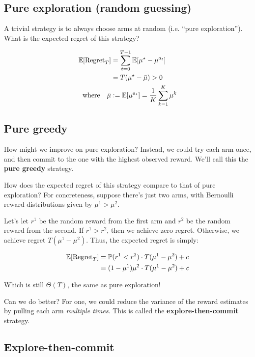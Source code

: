 \documentclass[../main/main]{subfiles}
\begin{document}

\subsection{Pure exploration (random guessing)}

A trivial strategy is to always choose arms at random (i.e. ``pure exploration''). What is the expected regret of this strategy?

\begin{align*}
    \operatorname*{\mathbb{E}}[\text{Regret}_T] &= \sum_{t=0}^{T-1} \operatorname*{\mathbb{E}}[\mu^\star - \mu^{a_t}] \\
    &= T (\mu^\star - \bar \mu) > 0 \\
    \text{where} \quad \bar \mu &:= \operatorname*{\mathbb{E}}[\mu^{a_t}] = \frac{1}{K} \sum_{k=1}^K \mu^k
\end{align*}


\subsection{Pure greedy}

How might we improve on pure exploration? Instead, we could try each arm once, and then commit to the one with the highest observed reward. We'll call this the \textbf{pure greedy} strategy.

How does the expected regret of this strategy compare to that of pure exploration? For concreteness, suppose there's just two arms, with Bernoulli reward distributions given by $\mu^1 > \mu^2$.

Let's let $r^1$ be the random reward from the first arm and $r^2$ be the random reward from the second. If $r^1 > r^2$, then we achieve zero regret. Otherwise, we achieve regret $T(\mu^1 - \mu^2)$. Thus, the expected regret is simply:

\begin{align*}
    \operatorname*{\mathbb{E}}[\text{Regret}_T] &= \operatorname{\mathbb{P}}(r^1 < r^2) \cdot T(\mu^1 - \mu^2) + c \\
    &= (1 - \mu^1) \mu^2 \cdot T(\mu^1 - \mu^2) + c
\end{align*}

Which is still $\Theta(T)$, the same as pure exploration!

Can we do better? For one, we could reduce the variance of the reward estimates by pulling each arm \emph{multiple times}. This is called the \textbf{explore-then-commit} strategy.

\subsection{Explore-then-commit}
\end{document}

